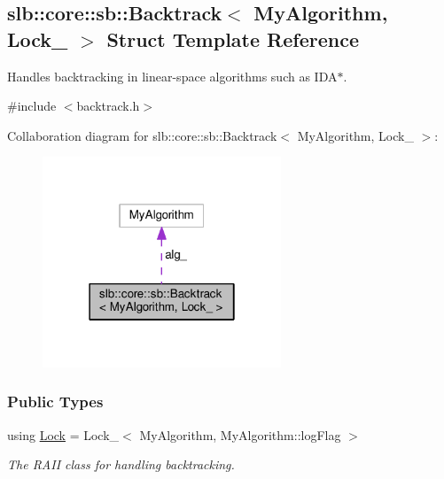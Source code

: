 \hypertarget{structslb_1_1core_1_1sb_1_1Backtrack}{}\subsection{slb\+:\+:core\+:\+:sb\+:\+:Backtrack$<$ My\+Algorithm, Lock\+\_\+ $>$ Struct Template Reference}
\label{structslb_1_1core_1_1sb_1_1Backtrack}


Handles backtracking in linear-\/space algorithms such as I\+D\+A$\ast$.  




{\ttfamily \#include $<$backtrack.\+h$>$}



Collaboration diagram for slb\+:\+:core\+:\+:sb\+:\+:Backtrack$<$ My\+Algorithm, Lock\+\_\+ $>$\+:\nopagebreak
\begin{figure}[H]
\begin{center}
\leavevmode
\includegraphics[width=202pt]{structslb_1_1core_1_1sb_1_1Backtrack__coll__graph}
\end{center}
\end{figure}
\subsubsection*{Public Types}
\begin{DoxyCompactItemize}
\item 
using \hyperlink{structslb_1_1core_1_1sb_1_1Backtrack_abdf145f8f0475d4f557024f6981b0668}{Lock} = Lock\+\_\+$<$ My\+Algorithm, My\+Algorithm\+::log\+Flag $>$\hypertarget{structslb_1_1core_1_1sb_1_1Backtrack_abdf145f8f0475d4f557024f6981b0668}{}\label{structslb_1_1core_1_1sb_1_1Backtrack_abdf145f8f0475d4f557024f6981b0668}

\begin{DoxyCompactList}\small\item\em The R\+A\+II class for handling backtracking. \end{DoxyCompactList}\end{DoxyCompactItemize}

